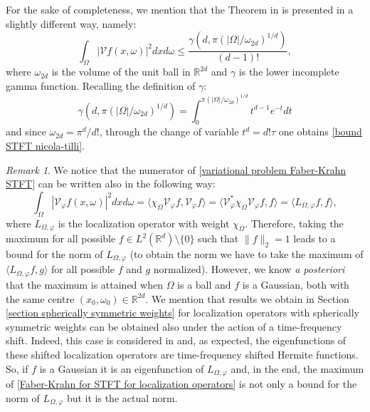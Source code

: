 \documentclass[corpo=11pt, stile=classica, tipotesi=custom,
greek, evenboxes, english]{toptesi}
\numberwithin{equation}{chapter}
\theoremstyle{definition}
\theoremstyle{remark}
\newtheorem*{remark}{Remark}
\newcommand{\R}{\mathbb{R}} %
\newcommand{\V}{\mathcal{V}} %
\begin{document}
For the sake of completeness, we mention that the Theorem in \cite{nicolatilli_fk} is presented in a slightly different way, namely:
\begin{equation*}
	\int_{\Omega}  |\V f(x,\omega)|^2 dx d\omega \leq \dfrac{\gamma\left(d, \pi(|\Omega|/\omega_{2d})^{1/d}\right)}{(d-1)!},
\end{equation*}
where $\omega_{2d}$ is the volume of the unit ball in $\R^{2d}$ and $\gamma$ is the lower incomplete gamma function. Recalling the definition of $\gamma$:
\begin{equation*}
	\gamma\left(d, \pi(|\Omega|/\omega_{2d})^{1/d}\right) = \int_0^{\pi(|\Omega|/\omega_{2d})^{1/d}} t^{d-1} e^{-t}dt 
\end{equation*}
and since $\omega_{2d} = \pi^d / d!$, through the change of variable $t^d = d! \tau$  one obtains \eqref{bound STFT nicola-tilli}.
\begin{remark}
	We notice that the numerator of \eqref{variational problem Faber-Krahn STFT} can be written also in the following way:
	\begin{equation}\label{Faber-Krahn for STFT for localization operators}
		\int_{\Omega} |\V_{\varphi} f(x,\omega)|^2 dx d\omega = \langle \chi_{\Omega} \V_{\varphi} f, \V_{\varphi} f \rangle = \langle \V_{\varphi}^* \chi_{\Omega} \V_{\varphi} f,f \rangle = \langle L_{\Omega,\varphi} f,f \rangle,
	\end{equation}
	where $L_{\Omega,\varphi}$ is the localization operator with weight $\chi_{\Omega}$. Therefore, taking the maximum for all possible $f \in L^2(\R^d) \setminus\{0\}$ such that $\|f\|_2=1$ leads to a bound for the norm of $L_{\Omega,\varphi}$ (to obtain the norm we have to take the maximum of $\langle L_{\Omega, \varphi}f, g \rangle$ for all possible $f$ and $g$ normalized). However, we know \emph{a posteriori} that the maximum is attained when $\Omega$ is a ball and $f$ is a Gaussian, both with the same centre $(x_0, \omega_0) \in \R^{2d}$. We mention that results we obtain in Section \ref{section spherically symmetric weights} for localization operators with spherically symmetric weights can be obtained also under the action of a time-frequency shift. Indeed, this case is considered in \cite{daubechies} and, as expected, the eigenfunctions of these shifted localization operators are  time-frequency shifted Hermite functions. So, if $f$ is a Gaussian it is an eigenfunction of $L_{\Omega, \varphi}$ and, in the end, the maximum of \eqref{Faber-Krahn for STFT for localization operators} is not only a bound for the norm of $L_{\Omega, \varphi}$ but it is the actual norm.
\end{remark}
\end{document}
